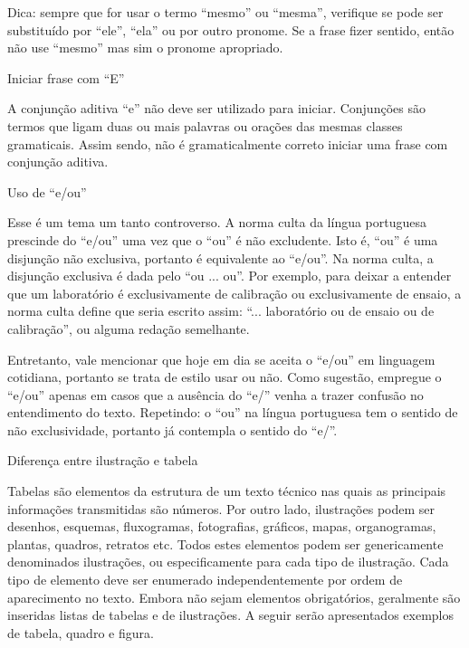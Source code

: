 \begin{enumerate}[label=\alph*)]
Dica: sempre que for usar o termo “mesmo” ou “mesma”, verifique se pode ser substituído por “ele”, “ela” ou por outro pronome. Se a frase fizer sentido, então não use “mesmo” mas sim o pronome apropriado.

{\bfseries \item  Iniciar frase com “E”}

A conjunção aditiva “e” não deve ser utilizado para iniciar. Conjunções são termos que ligam duas ou mais palavras ou orações das mesmas classes gramaticais. Assim sendo, não é gramaticalmente correto iniciar uma frase com conjunção aditiva.

{\bfseries \item  Uso de “e/ou”}

Esse é um tema um tanto controverso. A norma culta da língua portuguesa prescinde do “e/ou” uma vez que o “ou” é não excludente. Isto é, “ou” é uma disjunção não exclusiva, portanto é equivalente ao “e/ou”. Na norma culta, a disjunção exclusiva é dada pelo “ou ... ou”. Por exemplo, para deixar a entender que um laboratório é exclusivamente de calibração ou exclusivamente de ensaio, a norma culta define que seria escrito assim: “... laboratório ou de ensaio ou de calibração”, ou alguma redação semelhante.

Entretanto, vale mencionar que hoje em dia se aceita o “e/ou” em linguagem cotidiana, portanto se trata de estilo usar ou não. Como sugestão, empregue o “e/ou” apenas em casos que a ausência do “e/” venha a trazer confusão no entendimento do texto. Repetindo: o “ou” na língua portuguesa tem o sentido de não exclusividade, portanto já contempla o sentido do “e/”.

{\bfseries \item  Diferença entre ilustração e tabela}

Tabelas são elementos da estrutura de um texto técnico nas quais as principais informações transmitidas são números. Por outro lado, ilustrações podem ser desenhos, esquemas, fluxogramas, fotografias, gráficos, mapas, organogramas, plantas, quadros, retratos etc. Todos estes elementos podem ser genericamente denominados ilustrações, ou especificamente para cada tipo de ilustração. Cada tipo de elemento deve ser enumerado independentemente por ordem de aparecimento no texto. Embora não sejam elementos obrigatórios, geralmente são inseridas listas de tabelas e de ilustrações. A seguir serão apresentados exemplos de tabela, quadro e figura.




\begin{table}[!ht]
		\centering
		\IBGEtab{}{
		
}
\end{table}
\end{enumerate}
